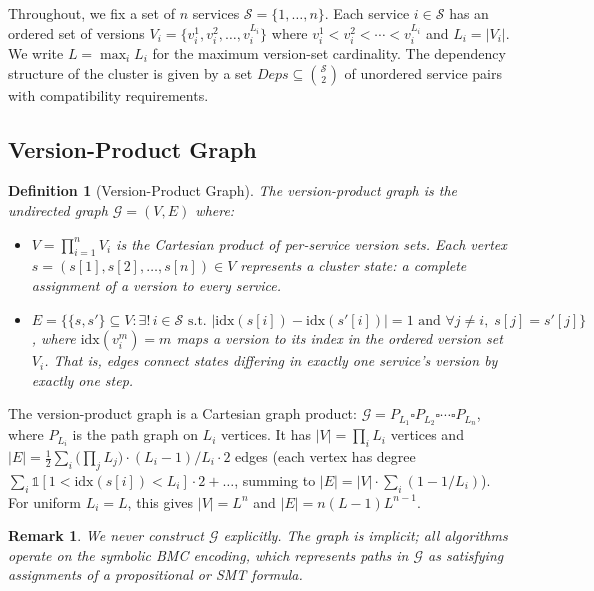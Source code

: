 \documentclass[10pt,twocolumn]{article}
\newtheorem{definition}[theorem]{Definition}
\newtheorem{remark}[theorem]{Remark}
\begin{document}
Throughout, we fix a set of $n$ services $\mathcal{S} = \{1, \ldots, n\}$.
Each service $i \in \mathcal{S}$ has an ordered set of versions
$V_i = \{v_i^1, v_i^2, \ldots, v_i^{L_i}\}$ where $v_i^1 < v_i^2 <
\cdots < v_i^{L_i}$ and $L_i = |V_i|$.  We write $L = \max_i L_i$ for
the maximum version-set cardinality.  The dependency structure of the
cluster is given by a set $\mathit{Deps} \subseteq \binom{\mathcal{S}}{2}$
of unordered service pairs with compatibility requirements.

\subsection{Version-Product Graph}
\label{sec:formal:vpg}

\begin{definition}[Version-Product Graph]
\label{def:vpg}
The \emph{version-product graph} is the undirected graph
$\mathcal{G} = (V, E)$ where:
\begin{itemize}
\item $V = \prod_{i=1}^{n} V_i$ is the Cartesian product of per-service
  version sets.  Each vertex $s = (s[1], s[2], \ldots, s[n]) \in V$
  represents a \emph{cluster state}: a complete assignment of a version to
  every service.
\item $E = \bigl\{\{s, s'\} \subseteq V : \exists!\, i \in \mathcal{S}
  \text{ s.t.\ } |{\mathrm{idx}(s[i]) - \mathrm{idx}(s'[i])}| = 1
  \text{ and } \forall j \neq i,\; s[j] = s'[j]\bigr\}$,
  where $\mathrm{idx}(v_i^m) = m$ maps a version to its index in the
  ordered version set~$V_i$.  That is, edges connect states differing in
  exactly one service's version by exactly one step.
\end{itemize}
\end{definition}

\noindent
The version-product graph is a Cartesian graph product:
$\mathcal{G} = P_{L_1} \square P_{L_2} \square \cdots \square P_{L_n}$,
where $P_{L_i}$ is the path graph on $L_i$ vertices.  It has
$|V| = \prod_i L_i$ vertices and
$|E| = \frac{1}{2} \sum_i \bigl(\prod_j L_j\bigr) \cdot (L_i - 1) /
L_i \cdot 2$ edges (each vertex has degree
$\sum_i \mathbb{1}[1 < \mathrm{idx}(s[i]) < L_i] \cdot 2 + \ldots$,
summing to $|E| = |V| \cdot \sum_i (1 - 1/L_i)$).  For uniform
$L_i = L$, this gives $|V| = L^n$ and $|E| = n(L-1)L^{n-1}$.

\begin{remark}
We never construct $\mathcal{G}$ explicitly.  The graph is implicit; all
algorithms operate on the symbolic BMC encoding, which represents paths in
$\mathcal{G}$ as satisfying assignments of a propositional or SMT formula.
\end{remark}
\end{document}
